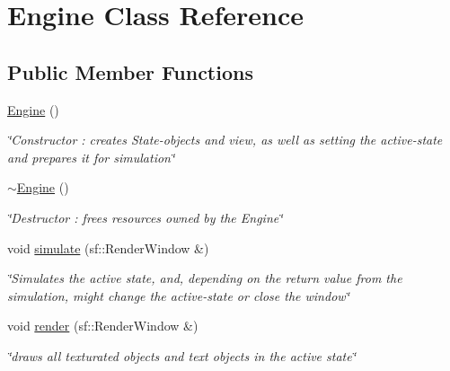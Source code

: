 \hypertarget{classEngine}{\section{Engine Class Reference}
\label{classEngine}
}
\subsection*{Public Member Functions}
\begin{DoxyCompactItemize}
\item 
\hypertarget{classEngine_a8c98683b0a3aa28d8ab72a8bcd0d52f2}{\hyperlink{classEngine_a8c98683b0a3aa28d8ab72a8bcd0d52f2}{Engine} ()}\label{classEngine_a8c98683b0a3aa28d8ab72a8bcd0d52f2}

\begin{DoxyCompactList}\small\item\em \char`\"{}\+Constructor \+: creates State-\/objects and view,
        as well as setting the active-\/state and prepares it for simulation\char`\"{} \end{DoxyCompactList}\item 
\hypertarget{classEngine_a8ef7030a089ecb30bbfcb9e43094717a}{\hyperlink{classEngine_a8ef7030a089ecb30bbfcb9e43094717a}{$\sim$\+Engine} ()}\label{classEngine_a8ef7030a089ecb30bbfcb9e43094717a}

\begin{DoxyCompactList}\small\item\em \char`\"{}\+Destructor \+: frees resources owned by the Engine\char`\"{} \end{DoxyCompactList}\item 
void \hyperlink{classEngine_abedfd6c2327693f468b710bd79a9fe4c}{simulate} (sf\+::\+Render\+Window \&)
\begin{DoxyCompactList}\small\item\em \char`\"{}\+Simulates the active state, and, depending on the return value
       from the simulation, might change the active-\/state or close the window\char`\"{} \end{DoxyCompactList}\item 
void \hyperlink{classEngine_a4d9a19bdf6a13b84570e400acab6de6c}{render} (sf\+::\+Render\+Window \&)
\begin{DoxyCompactList}\small\item\em \char`\"{}draws all texturated objects and text objects in the active state\char`\"{} \end{DoxyCompactList}\end{DoxyCompactItemize}


